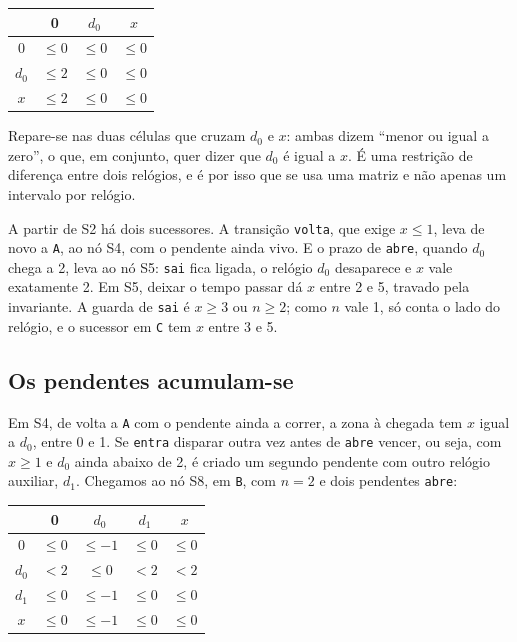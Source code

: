 \documentclass[11pt,a4paper]{article}
\newcommand{\code}[1]{\texttt{#1}}
\begin{document}
\begin{center}
\begin{tabular}{c|ccc}
 & 0 & \(d_0\) & \(x\) \\ \hline
0 & \(\leq 0\) & \(\leq 0\) & \(\leq 0\) \\
\(d_0\) & \(\leq 2\) & \(\leq 0\) & \(\leq 0\) \\
\(x\) & \(\leq 2\) & \(\leq 0\) & \(\leq 0\)
\end{tabular}
\end{center}

Repare-se nas duas células que cruzam \(d_0\) e \(x\): ambas dizem ``menor ou igual a zero'', o que, em conjunto, quer dizer que \(d_0\) é igual a \(x\). É uma restrição de diferença entre dois relógios, e é por isso que se usa uma matriz e não apenas um intervalo por relógio.

A partir de S2 há dois sucessores. A transição \code{volta}, que exige \(x \leq 1\), leva de novo a \code{A}, ao nó S4, com o pendente ainda vivo. E o prazo de \code{abre}, quando \(d_0\) chega a 2, leva ao nó S5: \code{sai} fica ligada, o relógio \(d_0\) desaparece e \(x\) vale exatamente 2. Em S5, deixar o tempo passar dá \(x\) entre 2 e 5, travado pela invariante. A guarda de \code{sai} é \(x \geq 3\) ou \(n \geq 2\); como \(n\) vale 1, só conta o lado do relógio, e o sucessor em \code{C} tem \(x\) entre 3 e 5.

\subsection{Os pendentes acumulam-se}

Em S4, de volta a \code{A} com o pendente ainda a correr, a zona à chegada tem \(x\) igual a \(d_0\), entre 0 e 1. Se \code{entra} disparar outra vez antes de \code{abre} vencer, ou seja, com \(x \geq 1\) e \(d_0\) ainda abaixo de 2, é criado um segundo pendente com outro relógio auxiliar, \(d_1\). Chegamos ao nó S8, em \code{B}, com \(n = 2\) e dois pendentes \code{abre}:

\begin{center}
\begin{tabular}{c|cccc}
 & 0 & \(d_0\) & \(d_1\) & \(x\) \\ \hline
0 & \(\leq 0\) & \(\leq -1\) & \(\leq 0\) & \(\leq 0\) \\
\(d_0\) & \(< 2\) & \(\leq 0\) & \(< 2\) & \(< 2\) \\
\(d_1\) & \(\leq 0\) & \(\leq -1\) & \(\leq 0\) & \(\leq 0\) \\
\(x\) & \(\leq 0\) & \(\leq -1\) & \(\leq 0\) & \(\leq 0\)
\end{tabular}
\end{center}
\end{document}
